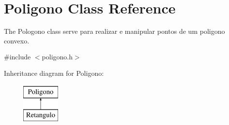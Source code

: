 \hypertarget{class_poligono}{}\section{Poligono Class Reference}
\label{class_poligono}


The Pologono class serve para realizar e manipular pontos de um poligono convexo.  




{\ttfamily \#include $<$poligono.\+h$>$}

Inheritance diagram for Poligono\+:\begin{figure}[H]
\begin{center}
\leavevmode
\includegraphics[height=2.000000cm]{dd/dfe/class_poligono}
\end{center}
\end{figure}
